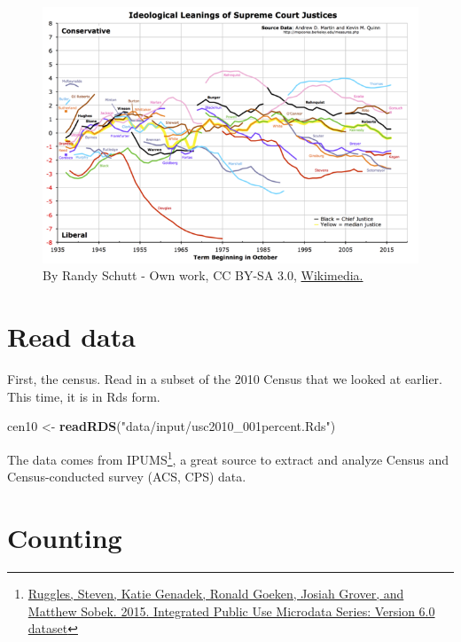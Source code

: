 \documentclass[
]{book}
\newenvironment{Shaded}{\begin{snugshade}}{\end{snugshade}}
\newcommand{\KeywordTok}[1]{\textcolor[rgb]{0.13,0.29,0.53}{\textbf{#1}}}
\newcommand{\NormalTok}[1]{#1}
\newcommand{\StringTok}[1]{\textcolor[rgb]{0.31,0.60,0.02}{#1}}
\theoremstyle{definition}
\theoremstyle{definition}
\theoremstyle{definition}
\theoremstyle{definition}
\theoremstyle{remark}
\begin{document}
\begin{figure}
\centering
\includegraphics{images/Martin-Quinn_Wikipedia.png}
\caption{By Randy Schutt - Own work, CC BY-SA 3.0, \href{https://commons.wikimedia.org/w/index.php?curid=29585342}{Wikimedia.}}
\end{figure}

\hypertarget{read-data-1}{%
\section{Read data}\label{read-data-1}}

First, the census. Read in a subset of the 2010 Census that we looked at earlier. This time, it is in Rds form.

\begin{Shaded}
\begin{Highlighting}[]
\NormalTok{cen10 <-}\StringTok{ }\KeywordTok{readRDS}\NormalTok{(}\StringTok{"data/input/usc2010_001percent.Rds"}\NormalTok{)}
\end{Highlighting}
\end{Shaded}

The data comes from IPUMS\footnote{\href{http://doi.org/10.18128/D010.V6.0}{Ruggles, Steven, Katie Genadek, Ronald Goeken, Josiah Grover, and Matthew Sobek. 2015. Integrated Public Use Microdata Series: Version 6.0 dataset}}, a great source to extract and analyze Census and Census-conducted survey (ACS, CPS) data.

\hypertarget{counting}{%
\section{Counting}\label{counting}}
\end{document}
